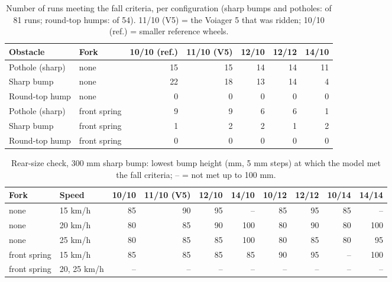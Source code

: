 \begin{table}[htbp]
\centering\small
\caption{Number of runs meeting the fall criteria, per configuration (sharp bumps and
potholes: of 81 runs; round-top humps: of 54). 11/10 (V5) = the Voiager 5 that was
ridden; 10/10 (ref.) = smaller reference wheels.}\label{tab:D1}
\begin{tabular}{@{}llrrrrr@{}}
\toprule
Obstacle & Fork & 10/10 (ref.) & 11/10 (V5) & 12/10 & 12/12 & 14/10 \\
\midrule
Pothole (sharp) & none & 15 & 15 & 14 & 14 & 11 \\
Sharp bump & none & 22 & 18 & 13 & 14 & 4 \\
Round-top hump & none & 0 & 0 & 0 & 0 & 0 \\
\addlinespace
Pothole (sharp) & front spring & 9 & 9 & 6 & 6 & 1 \\
Sharp bump & front spring & 1 & 2 & 2 & 1 & 2 \\
Round-top hump & front spring & 0 & 0 & 0 & 0 & 0 \\
\bottomrule
\end{tabular}
\end{table}

\begin{table}[htbp]
\centering\small
\caption{Rear-size check, 300 mm sharp bump: lowest bump height (mm, 5 mm steps) at which
the model met the fall criteria; -- = not met up to 100 mm.}\label{tab:D2}
\begin{tabular}{@{}llrrrrrrrr@{}}
\toprule
Fork & Speed & 10/10 & 11/10 (V5) & 12/10 & 14/10 & 10/12 & 12/12 & 10/14 & 14/14 \\
\midrule
none & 15 km/h & 85 & 90 & 95 & -- & 85 & 95 & 85 & -- \\
none & 20 km/h & 80 & 85 & 90 & 100 & 80 & 90 & 80 & 100 \\
none & 25 km/h & 80 & 85 & 85 & 100 & 80 & 85 & 80 & 95 \\
\addlinespace
front spring & 15 km/h & 85 & 85 & 85 & 85 & 90 & 95 & -- & 100 \\
front spring & 20, 25 km/h & -- & -- & -- & -- & -- & -- & -- & -- \\
\bottomrule
\end{tabular}
\end{table}

